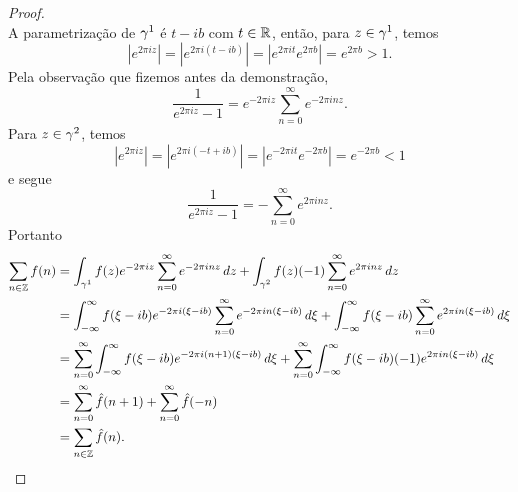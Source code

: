 \begin{proof}
\begin{equation*}
            \end{equation*}
            A parametrização de $\gamma^1$ é $t - ib$ com $t \in \mathbb{R}$, então, para $z \in \gamma^1$, 
            temos 
            \begin{equation*}
                |e^{2\pi i z}| = |e^{2\pi i(t - ib)}| = |e^{2\pi it}e^{2\pi b}| = e^{2\pi b} >1.
            \end{equation*}
            Pela observação que fizemos antes da demonstração,
            \begin{equation*}
             \frac{1}{e^{2\pi i z}-1} = e^{-2\pi i z}\sum_{n=0}^{\infty}e^{-2\pi i nz}.
            \end{equation*}
            Para $z \in \gamma^2$, temos
            \begin{equation*}
                |e^{2\pi i z}| = |e^{2\pi i(-t + ib)}| = |e^{-2\pi it}e^{-2\pi b}| = e^{-2\pi b} <1
            \end{equation*}
            e segue
            \begin{equation*}
                \frac{1}{e^{2\pi i z}-1} = -\sum_{n=0}^{\infty}e^{2\pi i nz}.
            \end{equation*}
            Portanto
            \begin{align*}
                \sum_{n \in \mathbb{Z}}f(n) &= \int_{\gamma^1} f(z) e^{-2\pi i z} 
                \sum_{n=0}^{\infty} e^{-2\pi i nz}\,dz 
                + \int_{\gamma^2} f(z)(-1) \sum_{n=0}^{\infty} e^{2\pi i nz}\,dz\\
                &= \int_{-\infty}^{\infty}f(\xi - ib)e^{-2\pi i (\xi - ib)}
                \sum_{n=0}^{\infty}e^{-2\pi i n(\xi - ib)}\,d\xi 
                + \int_{-\infty}^{\infty}f(\xi - ib)
                \sum_{n=0}^{\infty}e^{2\pi i n(\xi - ib)}\,d\xi \\
                &= \sum_{n=0}^{\infty} \int_{-\infty}^{\infty}f(\xi - ib)
                e^{-2\pi i (n+1)(\xi - ib)}\,d\xi 
                + \sum_{n=0}^{\infty} \int_{-\infty}^{\infty}f(\xi - ib)(-1)
                e^{2\pi i n(\xi - ib)}\,d\xi \\
                &= \sum_{n=0}^{\infty} \hat{f}(n+1) + \sum_{n=0}^{\infty} \hat{f}(-n) \\
                &= \sum_{n \in \mathbb{Z}} \hat{f}(n).
            \end{align*}
        \end{proof}
        
